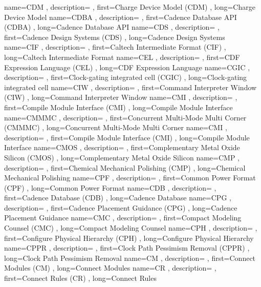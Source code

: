 { name={CDM}
, description={}
, first={Charge Device Model (CDM)}
, long={Charge Device Model}
}
{ name={CDBA}
, description={}
, first={Cadence Database API (CDBA)}
, long={Cadence Database API}
}
{ name={CDS}
, description={}
, first={Cadence Design Systems (CDS)}
, long={Cadence Design Systems}
}
{ name={CIF}
, description={}
, first={Caltech Intermediate Format (CIF)}
, long={Caltech Intermediate Format}
}
{ name={CEL}
, description={}
, first={CDF Expression Language (CEL)}
, long={CDF Expression Language}
}
{ name={CGIC}
, description={}
, first={Clock-gating integrated cell (CGIC)}
, long={Clock-gating integrated cell}
}
{ name={CIW}
, description={}
, first={Command Interpreter Window (CIW)}
, long={Command Interpreter Window}
}
{ name={CMI}
, description={}
, first={Compile Module Interface (CMI)}
, long={Compile Module Interface}
}
{ name={CMMMC}
, description={}
, first={Concurrent Multi-Mode Multi Corner (CMMMC)}
, long={Concurrent Multi-Mode Multi Corner}
}
{ name={CMI}
, description={}
, first={Compile Module Interface (CMI)}
, long={Compile Module Interface}
}
{ name={CMOS}
, description={}
, first={Complementary Metal Oxide Silicon (CMOS)}
, long={Complementary Metal Oxide Silicon}
}
{ name={CMP}
, description={}
, first={Chemical Mechanical Polishing (CMP)}
, long={Chemical Mechanical Polishing}
}
{ name={CPF}
, description={}
, first={Common Power Format (CPF)}
, long={Common Power Format}
}
{ name={CDB}
, description={}
, first={Cadence Database (CDB)}
, long={Cadence Database}
}
{ name={CPG}
, description={}
, first={Cadence Placement Guidance (CPG)}
, long={Cadence Placement Guidance}
}
{ name={CMC}
, description={}
, first={Compact Modeling Counsel (CMC)}
, long={Compact Modeling Counsel}
}
{ name={CPH}
, description={}
, first={Configure Physical Hierarchy (CPH)}
, long={Configure Physical Hierarchy}
}
{ name={CPPR}
, description={}
, first={Clock Path Pessimism Removal (CPPR)}
, long={Clock Path Pessimism Removal}
}
{ name={CM}
, description={}
, first={Connect Modules (CM)}
, long={Connect Modules}
}
{ name={CR}
, description={}
, first={Connect Rules (CR)}
, long={Connect Rules}
}
